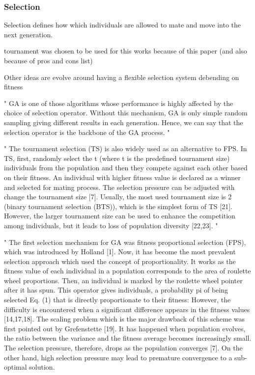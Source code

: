 \subsubsection{Selection}
Selection defines how which individuals are allowed to mate and move into the next generation.

tournament was chosen to be used for this works because of this paper (and also because of pros and cons list)

Other ideas are evolve around having a flexible selection system debending on fitness 

"
GA is one of those algorithms whose performance is highly affected by the choice of selection operator. Without this mechanism, GA is only simple random sampling giving different results in each generation. Hence, we can say that the selection operator is the backbone of the GA process.
" \cite{hussain_trade-off_2020}

"
The tournament selection (TS) is also widely used as an alternative to FPS. In TS, first, randomly select the t (where t is the predefined tournament size) individuals from the population and then they compete against each other based on their fitness. An individual with higher fitness value is declared as a winner and selected for mating process. The selection pressure can be adjusted with change the tournament size [7]. Usually, the most used tournament size is 2 (binary tournament selection (BTS)), which is the simplest form of TS [21]. However, the larger tournament size can be used to enhance the competition among individuals, but it leads to loss of population diversity [22,23].
"\cite{hussain_trade-off_2020}

"
The first selection mechanism for GA was fitness proportional selection (FPS), which was introduced by Holland [1]. Now, it has become the most prevalent selection approach which used the concept of proportionality. It works as the fitness value of each individual in a population corresponds to the area of roulette wheel proportions. Then, an individual is marked by the roulette wheel pointer after it has spun. This operator gives individuals, a probability pi of being selected Eq. (1) that is directly proportionate to their fitness:
However, the difficulty is encountered when a significant difference appears in the fitness values [14,17,18]. The scaling problem which is the major drawback of this scheme was first pointed out by Grefenstette [19]. It has happened when population evolves, the ratio between the variance and the fitness average becomes increasingly small. The selection pressure, therefore, drops as the population converges [7]. On the other hand, high selection pressure may lead to premature convergence to a sub-optimal solution.



